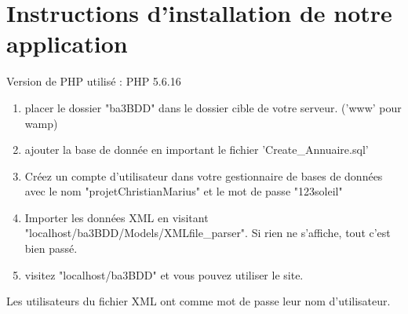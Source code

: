 \documentclass[11pt,a4paper]{report}
\begin{document}
\section*{Instructions d'installation de notre application}
Version de PHP utilisé : PHP 5.6.16
\begin{enumerate}
\item placer le dossier "ba3BDD" dans le dossier cible de votre serveur. ('www' pour wamp) 
\item ajouter la base de donnée en important le fichier 'Create\_Annuaire.sql' 
\item Créez un compte d'utilisateur dans votre gestionnaire de bases de données avec le nom "projetChristianMarius" et le mot de passe "123soleil"
\item Importer les données XML en visitant "localhost/ba3BDD/Models/XMLfile\_parser". Si rien ne s'affiche, tout c'est bien passé.
\item visitez "localhost/ba3BDD" et vous pouvez utiliser le site.
\end{enumerate} 
Les utilisateurs du fichier XML ont comme mot de passe leur nom d'utilisateur.
\end{document}
